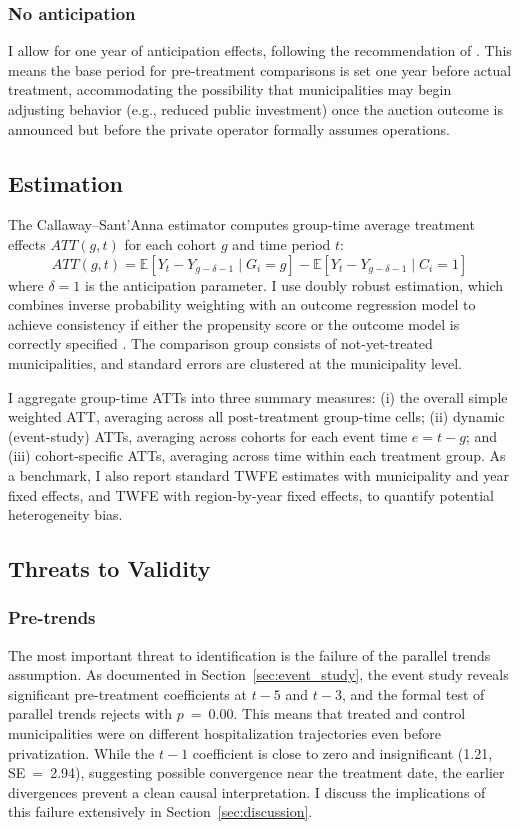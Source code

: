 \documentclass[12pt]{article}
\newcommand{\E}{\mathbb{E}}
\begin{document}
\subsubsection*{No anticipation} I allow for one year of anticipation effects, following the recommendation of \citet{callaway2021did}. This means the base period for pre-treatment comparisons is set one year before actual treatment, accommodating the possibility that municipalities may begin adjusting behavior (e.g., reduced public investment) once the auction outcome is announced but before the private operator formally assumes operations.

\subsection{Estimation}

The Callaway--Sant'Anna estimator computes group-time average treatment effects $ATT(g,t)$ for each cohort $g$ and time period $t$:
\begin{equation}
ATT(g,t) = \E[Y_t - Y_{g-\delta-1} \mid G_i = g] - \E[Y_t - Y_{g-\delta-1} \mid C_i = 1]
\label{eq:attgt}
\end{equation}
where $\delta = 1$ is the anticipation parameter. I use doubly robust estimation, which combines inverse probability weighting with an outcome regression model to achieve consistency if either the propensity score or the outcome model is correctly specified \citep{santanna2020doubly}. The comparison group consists of not-yet-treated municipalities, and standard errors are clustered at the municipality level.

I aggregate group-time ATTs into three summary measures: (i) the overall simple weighted ATT, averaging across all post-treatment group-time cells; (ii) dynamic (event-study) ATTs, averaging across cohorts for each event time $e = t - g$; and (iii) cohort-specific ATTs, averaging across time within each treatment group. As a benchmark, I also report standard TWFE estimates with municipality and year fixed effects, and TWFE with region-by-year fixed effects, to quantify potential heterogeneity bias.

\subsection{Threats to Validity}

\subsubsection*{Pre-trends} The most important threat to identification is the failure of the parallel trends assumption. As documented in Section~\ref{sec:event_study}, the event study reveals significant pre-treatment coefficients at $t-5$ and $t-3$, and the formal test of parallel trends rejects with $p$~=~0.00. This means that treated and control municipalities were on different hospitalization trajectories even before privatization. While the $t-1$ coefficient is close to zero and insignificant (1.21, SE~=~2.94), suggesting possible convergence near the treatment date, the earlier divergences prevent a clean causal interpretation. I discuss the implications of this failure extensively in Section~\ref{sec:discussion}.
\end{document}
